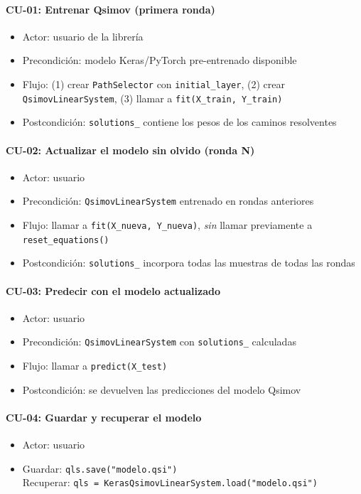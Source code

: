 \paragraph{CU-01: Entrenar Qsimov (primera ronda)}
\begin{itemize}
  \item Actor: usuario de la librería
  \item Precondición: modelo Keras/PyTorch pre-entrenado disponible
  \item Flujo: (1) crear \texttt{PathSelector} con \texttt{initial\_layer}, (2) crear
        \texttt{QsimovLinearSystem}, (3) llamar a \texttt{fit(X\_train, Y\_train)}
  \item Postcondición: \texttt{solutions\_} contiene los pesos de los caminos resolventes
\end{itemize}

\paragraph{CU-02: Actualizar el modelo sin olvido (ronda N)}
\begin{itemize}
  \item Actor: usuario
  \item Precondición: \texttt{QsimovLinearSystem} entrenado en rondas anteriores
  \item Flujo: llamar a \texttt{fit(X\_nueva, Y\_nueva)}, \textit{sin} llamar
        previamente a \texttt{reset\_equations()}
  \item Postcondición: \texttt{solutions\_} incorpora todas las muestras de todas las rondas
\end{itemize}

\paragraph{CU-03: Predecir con el modelo actualizado}
\begin{itemize}
  \item Actor: usuario
  \item Precondición: \texttt{QsimovLinearSystem} con \texttt{solutions\_} calculadas
  \item Flujo: llamar a \texttt{predict(X\_test)}
  \item Postcondición: se devuelven las predicciones del modelo Qsimov
\end{itemize}

\paragraph{CU-04: Guardar y recuperar el modelo}
\begin{itemize}
  \item Actor: usuario
  \item Guardar: \texttt{qls.save("modelo.qsi")} \\
        Recuperar: \texttt{qls = KerasQsimov\-Linear\-System.load("modelo.qsi")}
\end{itemize}

